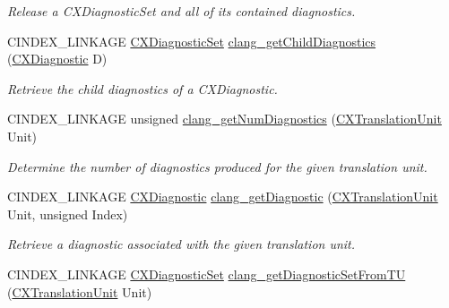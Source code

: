 \begin{DoxyCompactItemize}
\begin{DoxyCompactList}\small\item\em Release a C\+X\+Diagnostic\+Set and all of its contained diagnostics. \end{DoxyCompactList}\item 
C\+I\+N\+D\+E\+X\+\_\+\+L\+I\+N\+K\+A\+GE \mbox{\hyperlink{group__CINDEX__DIAG_ga38dfc0ae45b55bf7fd577eed9148e244}{C\+X\+Diagnostic\+Set}} \mbox{\hyperlink{group__CINDEX__DIAG_ga1aa24f925b34bb988dc3ea06ec27dcda}{clang\+\_\+get\+Child\+Diagnostics}} (\mbox{\hyperlink{group__CINDEX__DIAG_ga44bb8aba7c40590ad25d1763c4fbff7f}{C\+X\+Diagnostic}} D)
\begin{DoxyCompactList}\small\item\em Retrieve the child diagnostics of a C\+X\+Diagnostic. \end{DoxyCompactList}\item 
\mbox{\label{group__CINDEX__DIAG_gae9f047b4bbbbb01161478d549b7aab25}} 
C\+I\+N\+D\+E\+X\+\_\+\+L\+I\+N\+K\+A\+GE unsigned \mbox{\hyperlink{group__CINDEX__DIAG_gae9f047b4bbbbb01161478d549b7aab25}{clang\+\_\+get\+Num\+Diagnostics}} (\mbox{\hyperlink{group__CINDEX_gacdb7815736ca709ce9a5e1ec2b7e16ac}{C\+X\+Translation\+Unit}} Unit)
\begin{DoxyCompactList}\small\item\em Determine the number of diagnostics produced for the given translation unit. \end{DoxyCompactList}\item 
C\+I\+N\+D\+E\+X\+\_\+\+L\+I\+N\+K\+A\+GE \mbox{\hyperlink{group__CINDEX__DIAG_ga44bb8aba7c40590ad25d1763c4fbff7f}{C\+X\+Diagnostic}} \mbox{\hyperlink{group__CINDEX__DIAG_ga3f54a79e820c2ac9388611e98029afe5}{clang\+\_\+get\+Diagnostic}} (\mbox{\hyperlink{group__CINDEX_gacdb7815736ca709ce9a5e1ec2b7e16ac}{C\+X\+Translation\+Unit}} Unit, unsigned Index)
\begin{DoxyCompactList}\small\item\em Retrieve a diagnostic associated with the given translation unit. \end{DoxyCompactList}\item 
C\+I\+N\+D\+E\+X\+\_\+\+L\+I\+N\+K\+A\+GE \mbox{\hyperlink{group__CINDEX__DIAG_ga38dfc0ae45b55bf7fd577eed9148e244}{C\+X\+Diagnostic\+Set}} \mbox{\hyperlink{group__CINDEX__DIAG_gaf786e9688b9a685958e486cb81910924}{clang\+\_\+get\+Diagnostic\+Set\+From\+TU}} (\mbox{\hyperlink{group__CINDEX_gacdb7815736ca709ce9a5e1ec2b7e16ac}{C\+X\+Translation\+Unit}} Unit)

\end{DoxyCompactItemize}
